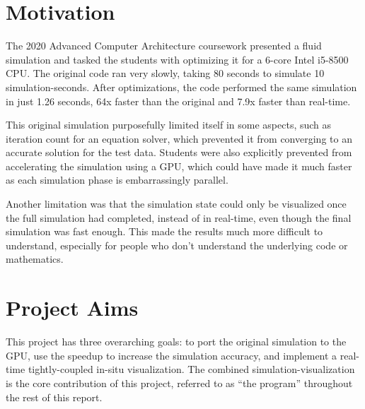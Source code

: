\section{Motivation}
The 2020 Advanced Computer Architecture coursework presented a fluid simulation and tasked the students with optimizing it for a 6-core Intel i5-8500 CPU\cite{modules:CS257Coursework}.
The original code ran very slowly, taking 80 seconds to simulate 10 simulation-seconds.
After optimizations, the code performed the same simulation in just 1.26 seconds, 64x faster than the original and 7.9x faster than real-time\cite{modules:aca257submission}.

This original simulation purposefully limited itself in some aspects, such as iteration count for an equation solver, which prevented it from converging to an accurate solution for the test data.
Students were also explicitly prevented from accelerating the simulation using a GPU, which could have made it much faster as each simulation phase is embarrassingly parallel.

Another limitation was that the simulation state could only be visualized once the full simulation had completed,
instead of in real-time, even though the final simulation was fast enough.
This made the results much more difficult to understand, especially for people who don't understand the underlying code or mathematics.

\section{Project Aims}
This project has three overarching goals: to port the original simulation to the GPU, use the speedup to increase the simulation accuracy, and implement a real-time tightly-coupled in-situ visualization.
The combined simulation-visualization is the core contribution of this project, referred to as ``the program'' throughout the rest of this report.

